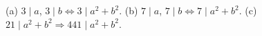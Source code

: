 (a) $3 \mid a$, $3 \mid b \Leftrightarrow 3 \mid a^2 + b^2$. (b) $7 \mid a$, $7 \mid b \Leftrightarrow 7 \mid a^2 + b^2$. (c) $21 \mid a^2 + b^2 \Rightarrow 441 \mid a^2 + b^2$.
